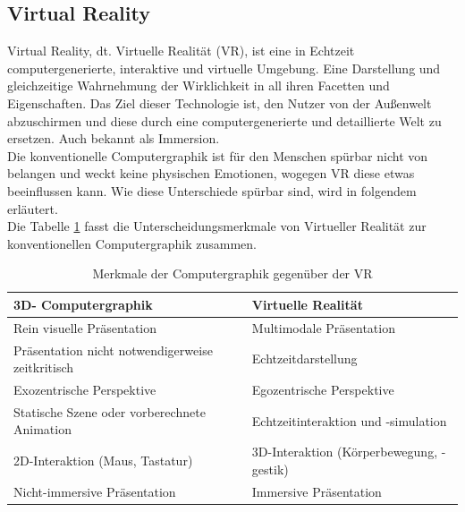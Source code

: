 \subsection*{Virtual Reality}
Virtual Reality, dt. Virtuelle Realität (\acs{VR}), ist eine in Echtzeit computergenerierte, interaktive und virtuelle Umgebung. Eine Darstellung 
und gleichzeitige Wahrnehmung der Wirklichkeit in all ihren Facetten und Eigenschaften. Das Ziel dieser Technologie ist, den Nutzer von der 
Außenwelt abzuschirmen und diese durch eine computergenerierte und detaillierte Welt zu ersetzen. \cite{vr.2018n} Auch bekannt als Immersion.
\\ 
\linebreak
Die konventionelle Computergraphik ist für den Menschen spürbar nicht von belangen und weckt keine physischen Emotionen, wogegen VR diese 
etwas beeinflussen kann. Wie diese Unterschiede spürbar sind, wird in folgendem erläutert.
\\  
Die Tabelle \ref{tbl:vrtabelle} fasst die Unterscheidungsmerkmale von Virtueller Realität zur konventionellen Computergraphik zusammen. \cite{springer.2019s}
\begin{table}[!htb]
    \centering
    \begin{tabular}{ll}
      \textbf{3D- Computergraphik}  & \textbf{Virtuelle Realität} \\
      \hline
      Rein visuelle Präsentation & Multimodale Präsentation \\ %
      \hline
      Präsentation nicht notwendigerweise zeitkritisch & Echtzeitdarstellung \\
      \hline
      Exozentrische Perspektive & Egozentrische Perspektive \\
      \hline
      Statische Szene oder vorberechnete Animation & Echtzeitinteraktion und -simulation \\ 
      \hline
      2D-Interaktion (Maus, Tastatur) & 3D-Interaktion (Körperbewegung, -gestik) \\ 
      \hline
      Nicht-immersive Präsentation & Immersive Präsentation \\ 
    \end{tabular}
    \caption{Merkmale der Computergraphik gegenüber der VR \cite{springer.2019s}}
    \label{tbl:vrtabelle}
\end{table}
\\ 
\linebreak 
